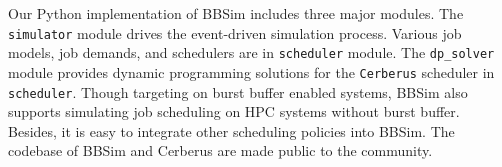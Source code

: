 


Our Python implementation of BBSim includes three major modules.
The \texttt{simulator} module drives the event-driven simulation process.
Various job models, job demands, and schedulers are in \texttt{scheduler} module.
The \texttt{dp\_solver} module provides dynamic programming solutions for
the \texttt{Cerberus} scheduler in \texttt{scheduler}.
Though targeting on burst buffer enabled systems,
BBSim also supports simulating job scheduling on HPC systems without burst buffer.
Besides, it is easy to integrate other scheduling policies into BBSim.
The codebase of BBSim and Cerberus are made public to the community\cite{bbsim-github}.


